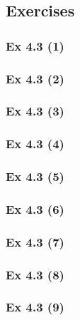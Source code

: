 \subsection*{Exercises}\label{sec:4.3_Exercises}

\subsubsection{Ex 4.3 (1)}\label{sec:Ex_4.3.1}

\subsubsection{Ex 4.3 (2)}\label{sec:Ex_4.3.2}

\subsubsection{Ex 4.3 (3)}\label{sec:Ex_4.3.3}

\subsubsection{Ex 4.3 (4)}\label{sec:Ex_4.3.4}

\subsubsection{Ex 4.3 (5)}\label{sec:Ex_4.3.5}

\subsubsection{Ex 4.3 (6)}\label{sec:Ex_4.3.6}

\subsubsection{Ex 4.3 (7)}\label{sec:Ex_4.3.7}

\subsubsection{Ex 4.3 (8)}\label{sec:Ex_4.3.8}

\subsubsection{Ex 4.3 (9)}\label{sec:Ex_4.3.9}

